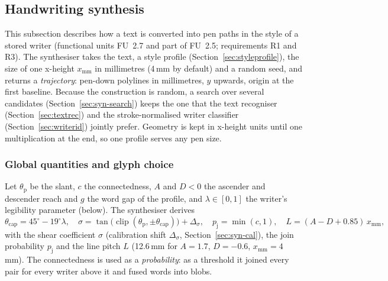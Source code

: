 \subsection{Handwriting synthesis}
\label{sec:synthesis}

This subsection describes how a text is converted into pen paths in the style of a stored writer (functional units FU~2.7 and part of FU~2.5; requirements R1 and R3).
The synthesiser takes the text, a style profile (Section~\ref{sec:styleprofile}), the size of one x-height $x_{\mathrm{mm}}$ in millimetres (4\,mm by default) and a random seed, and returns a \emph{trajectory}: pen-down polylines in millimetres, $y$ upwards, origin at the first baseline.
Because the construction is random, a search over several candidates (Section~\ref{sec:syn-search}) keeps the one that the text recogniser (Section~\ref{sec:textrec}) and the stroke-normalised writer classifier (Section~\ref{sec:writerid}) jointly prefer.
Geometry is kept in x-height units until one multiplication at the end, so one profile serves any pen size.

\subsubsection{Global quantities and glyph choice}

Let $\theta_{\mathrm p}$ be the slant, $c$ the connectedness, $A$ and $D<0$ the ascender and descender reach and $g$ the word gap of the profile, and $\lambda\in[0,1]$ the writer's legibility parameter (below).
The synthesiser derives
\begin{equation}
\theta_{\mathrm{cap}}=45^\circ-19^\circ\lambda,\quad\sigma=\tan\!\bigl(\operatorname{clip}(\theta_{\mathrm p},\pm\theta_{\mathrm{cap}})\bigr)+\Delta_\sigma,\quad p_{\mathrm j}=\min(c,1),\quad L=(A-D+0.85)\,x_{\mathrm{mm}},
\label{eq:syn-global}
\end{equation}
with the shear coefficient $\sigma$ (calibration shift $\Delta_\sigma$, Section~\ref{sec:syn-cal}), the join probability $p_{\mathrm j}$ and the line pitch $L$ (12.6\,mm for $A=1.7$, $D=-0.6$, $x_{\mathrm{mm}}=4$\,mm).
The connectedness is used as a \emph{probability}: as a threshold it joined every pair for every writer above it and fused words into blobs.

